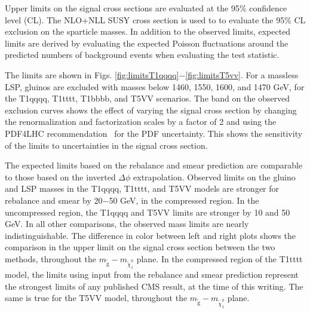Upper limits
on the signal cross sections are evaluated at the 95\% confidence level (CL).
The NLO+NLL SUSY cross section is used to
to evaluate the 95\% CL exclusion on the sparticle masses.
In addition to the observed limits,
expected limits are derived by evaluating the
expected Poisson fluctuations around the predicted
numbers of background events when evaluating the test statistic.

The limits are shown in Figs. \ref{fig:limitsT1qqqq}$-$\ref{fig:limitsT5vv}. For a massless LSP, gluinos are excluded with masses below 1460, 1550, 1600, and 1470 GeV,
for the T1qqqq, T1tttt, T1bbbb, and T5VV scenarios. The band on the observed exclusion curves shows the effect of varying the signal cross section by changing the renormalization and factorization scales by a factor of 2 and using the PDF4LHC recommendation~\cite{Botje:2011sn} for the PDF uncertainty. This shows the sensitivity of the limits to uncertainties in the signal cross section. 

The expected limits based on the rebalance and smear prediction are comparable to those based on the inverted $\Delta\phi$ extrapolation.  Observed limits on the gluino and LSP masses in the T1qqqq, T1tttt, and T5VV models are stronger for rebalance and smear by 20$-$50 GeV, in the compressed region. In the uncompressed region, the T1qqqq and T5VV limits are stronger by 10 and 50 GeV. In all other comparisons, the observed mass limits are nearly indistinguishable. The difference in color between left and right plots shows the comparison in the upper limit on the signal cross section between the two methods, throughout the $m_{\tilde{\text{g}}}-m_{\tilde{\chi}_{1}^{0}}$ plane. In the compressed region of the T1tttt model, the limits using input from the rebalance and smear prediction represent the strongest limits of any published CMS result, at the time of this writing. The same is true for the T5VV model, throughout the $m_{\tilde{\text{g}}}-m_{\tilde{\chi}_{1}^{0}}$ plane.

